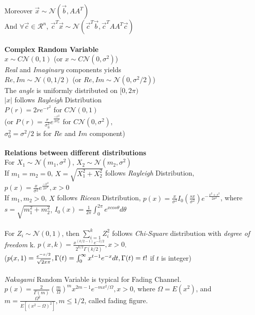 \documentclass [12pt] {article}
\begin{document}
\begin{spacing}{1.5}
\begin{multicols}{2}
Moreover $\vec{x} \sim \mathcal{N}(\vec{b}, A A^T)$\\
And $\forall \vec c \in \mathcal{R}^n$, $\vec{c}^T \vec{x} \sim \mathcal{N}(\vec{c}^T \vec{b}, \vec{c}^T A A^T \vec{c})$\\
~\\
\textbf{Complex Random Variable}\\
 $x \sim C\mathcal{N}(0,1)$ (or $x \sim C\mathcal{N}(0,\sigma^2)$)\\
 \emph{Real} and \emph{Imaginary} components yields \\
 $Re, Im\sim \mathcal{N}(0, 1/2)$ (or $Re, Im\sim \mathcal{N}(0, \sigma^2 /2)$)\\
 The \emph{angle} is uniformly distributed on $[0, 2\pi)$\\
 $|x|$ follows \emph{Rayleigh} Distribution\\
 $P(r) = 2r e^{-r^2}$ for $C\mathcal{N}(0,1)$\\
 (or $P(r) = \frac{r}{\sigma_0^2} e^{\frac{-r^2}{2\sigma_0^2}}$ for $C\mathcal{N}(0, \sigma^2)$, \\
 $\sigma_0^2 =\sigma^2/2$ is for $Re$ and $Im$ component)\\
 ~\\
 \textbf{Relations between different distributions}\\
For $X_1 \sim \mathcal{N}(m_1, \sigma^2)$, $X_2 \sim \mathcal{N}(m_2, \sigma^2)$\\
If $m_1 = m_2 = 0$, $X = \sqrt{X_1^2 + X_2 ^2}$ follows \emph{Rayleigh} Distribution, $p(x) = \frac{x}{\sigma^2} e^{\frac{-x^2}{2\sigma^2}}, x>0$\\
If $m_1, m_2 >0$, $X$ follows \emph{Ricean} Distribution, $p(x) = \frac{x}{\sigma ^2}I_0(\frac{s x}{\sigma^2})e^{-\frac{x^2+s^2}{2\sigma^2}}$, where $s = \sqrt{m_1^2 + m_2^2}$, $I_0(x) = \frac{1}{2\pi}\int_0^{2\pi}e^{x cos \theta} d\theta$\\ 
~\\
For $Z_i \sim \mathcal{N}(0,1)$, then $\sum_{i=1}^{k} Z_i^2$ follows \emph{Chi-Square} distribution with \emph{degree of freedom} k. $p(x,k) = \frac{x^{(k/2-1)}e^{-x/2}}{2^{k/2}\Gamma(k/2)}, x>0$. \\
($p(x,1) = \frac{e^{-x/2}}{\sqrt{2x\pi}}, \\
\Gamma(t) = \int_0^\infty x^{t-1}e^{-x}dt, \Gamma(t) = t!$ if $t$ is integer)\\
~\\
\emph{Nakagami} Random Variable is typical for Fading Channel.\\
$p(x) = \frac{2}{\Gamma(m)}(\frac{m}{\Omega})^m x^{2m-1}e^{-m x^2/\Omega}, x>0$, where $\Omega = E(x^2)$, and $m = \frac{\Omega^2}{E[(x^2-\Omega)^2]}, m \leq 1/2$, called fading figure. \\

\end{multicols}
\end{spacing}
\end{document}
